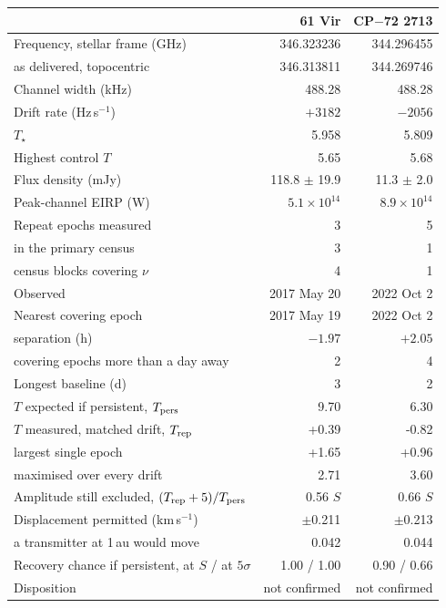 \begin{tabular}{@{}>{\raggedright\arraybackslash}p{}@{~~}r@{~~}r@{}}
\hline
 & 61 Vir & CP$-$72 2713 \\
\hline
Frequency, stellar frame (GHz) & 346.323236 & 344.296455 \\
\quad as delivered, topocentric & 346.313811 & 344.269746 \\
Channel width (kHz) & 488.28 & 488.28 \\
Drift rate (Hz\,s$^{-1}$) & $+3182$ & $-2056$ \\
$T_\star$ & 5.958 & 5.809 \\
Highest control $T$ & 5.65 & 5.68 \\
Flux density (mJy) & 118.8 $\pm$ 19.9 & 11.3 $\pm$ 2.0 \\
Peak-channel EIRP (W) & $5.1 \times 10^{14}$ & $8.9 \times 10^{14}$ \\
Repeat epochs measured & 3 & 5 \\
\quad in the primary census & 3 & 1 \\
\quad census blocks covering $\nu$ & 4 & 1 \\
Observed & 2017 May 20 & 2022 Oct 2 \\
Nearest covering epoch & 2017 May 19 & 2022 Oct 2 \\
\quad separation (h) & $-1.97$ & $+2.05$ \\
\quad covering epochs more than a day away & 2 & 4 \\
Longest baseline (d) & 3 & 2 \\
$T$ expected if persistent, $T_{\rm pers}$ & 9.70 & 6.30 \\
$T$ measured, matched drift, $T_{\rm rep}$ & +0.39 & -0.82 \\
\quad largest single epoch & +1.65 & +0.96 \\
\quad maximised over every drift & 2.71 & 3.60 \\
Amplitude still excluded, $(T_{\rm rep}+5)/T_{\rm pers}$ & 0.56 $S$ & 0.66 $S$ \\
Displacement permitted (km\,s$^{-1}$) & $\pm$0.211 & $\pm$0.213 \\
\quad a transmitter at 1\,au would move & 0.042 & 0.044 \\
Recovery chance if persistent, at $S$ / at $5\sigma$ & 1.00 / 1.00 & 0.90 / 0.66 \\
Disposition & not confirmed & not confirmed \\
\hline
\end{tabular}
